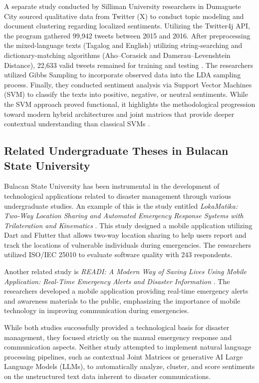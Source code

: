 \documentclass[12pt,a4paper]{report}
\begin{document}
A separate study conducted by Silliman University researchers in Dumaguete City
sourced qualitative data from Twitter (X) to conduct topic modeling and
document clustering regarding localized sentiments. Utilizing the Twitter4j
API, the program gathered 99,942 tweets between 2015 and 2016. After
preprocessing the mixed-language texts (Tagalog and English) utilizing
string-searching and dictionary-matching algorithms (Aho--Corasick and
Damerau--Levenshtein Distance), 22,633 valid tweets remained for training and
testing \parencite{montenegro2018}. The researchers utilized Gibbs Sampling to
incorporate observed data into the LDA sampling process. Finally, they
conducted sentiment analysis via Support Vector Machines (SVM) to classify the
texts into positive, negative, or neutral sentiments. While the SVM approach
proved functional, it highlights the methodological progression toward modern
hybrid architectures and joint matrices that provide deeper contextual
understanding than classical SVMs \parencite{montenegro2018}.

\subsection{Related Undergraduate Theses in Bulacan State University}

Bulacan State University has been instrumental in the development of
technological applications related to disaster management through various
undergraduate studies. An example of this is the study entitled
\emph{LokaMatika: Two-Way Location Sharing and Automated Emergency Response
Systems with Trilateration and Kinematics} \parencite{manalo2024}. This study
designed a mobile application utilizing Dart and Flutter that allows two-way
location sharing to help users report and track the locations of vulnerable
individuals during emergencies. The researchers utilized ISO/IEC 25010 to
evaluate software quality with 243 respondents.

Another related study is \emph{READI: A Modern Way of Saving Lives Using
Mobile Application: Real-Time Emergency Alerts and Disaster Information}
\parencite{deguzman2019}. The researchers developed a mobile application providing
real-time emergency alerts and awareness materials to the public, emphasizing
the importance of mobile technology in improving communication during
emergencies.

While both studies successfully provided a technological basis for disaster
management, they focused strictly on the manual emergency response and
communication aspects. Neither study attempted to implement natural language
processing pipelines, such as contextual Joint Matrices or generative AI Large
Language Models (LLMs), to automatically analyze, cluster, and score sentiments
on the unstructured text data inherent to disaster communications.
\end{document}
